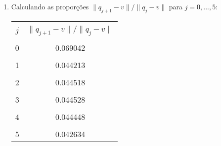 \documentclass[a4paper,11pt]{article}
\begin{document}
\begin{enumerate}[label=\textbf{(\alph*)}]
            \item Calculando as proporções $\|q_{j+1}-v\| / \|q_{j}-v\|$ para $j=0,...,5$:
            \begin{center}
                \begin{tabular}{ | c | c |} 
                    \hline
                    & \\ [-1em]
                    $j$ & $\|q_{j+1}-v\| / \|q_{j}-v\|$\\  [+.5em]
                    \hline\hline
                    & \\ [-1em]
                    0 & 0.069042\\ [+.5em]
                    \hline
                    & \\ [-1em]
                    1 & 0.044213\\ [+.5em]
                    \hline
                    &\\ [-1em]
                    2 & 0.044518\\ [+.5em]
                    \hline
                    & \\ [-1em]
                    3 & 0.044528\\ [+.5em]
                    \hline
                    & \\ [-1em]
                    4 & 0.044448 \\ [+.5em]
                    \hline
                    & \\ [-1em]
                    5 & 0.042634 \\ [+.5em]
                    \hline
                \end{tabular}
            \end{center}
        

\end{enumerate}
\end{document}
